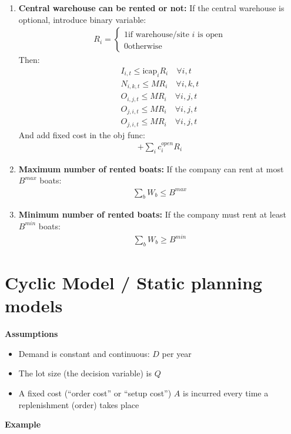 \documentclass[10pt]{article}
\begin{document}
\begin{enumerate}
\begin{gather*}
        \sum_r V_{b,r} \le W_b \quad \forall b
    \end{gather*}
    This prevents the boat from switching routes between periods.
    \item \textbf{Central warehouse can be rented or not:} If the central warehouse is optional, introduce binary variable:
    \begin{gather*}
        R_i =
            \begin{cases}
            1  \text{if warehouse/site } i \text{ is open}\\
            0 \text{otherwise}
            \end{cases}
    \end{gather*}
    Then: 
    \begin{gather*}
        I_{i,t} \le \text{icap}_i R_i \quad \forall i,t\\
        N_{i,k,t} \le M R_i \quad \forall i,k,t\\
        O_{i,j,t} \le M R_i \quad \forall i,j,t\\
        O_{j,i,t} \le M R_i \quad \forall i,j,t\\
        O_{j,i,t} \le M R_i \quad \forall i,j,t
    \end{gather*}
    And add fixed cost in the obj func: 
    \begin{gather*}
        + \sum_i c_i^{open} R_i
    \end{gather*}
    \item \textbf{Maximum number of rented boats:} If the company can rent at most $B^{max}$ boats:
    \begin{gather*}
        \sum_b W_b \le B^{max}
    \end{gather*}
    \item \textbf{Minimum number of rented boats:} If the company must rent at least $B^{min}$ boats:
    \begin{gather*}
        \sum_b W_b \ge B^{min}
    \end{gather*}
\end{enumerate}
\newpage 
\section{Cyclic Model / Static planning models}
\textbf{Assumptions}
\begin{itemize}
    \item Demand is constant and continuous: $D $ per year 
    \item The lot size (the decision variable) is $Q $
    \item A fixed cost (``order cost'' or ``setup cost'') $A $ is incurred every time a replenishment (order) takes place  
\end{itemize}
\textbf{Example}
\end{document}
